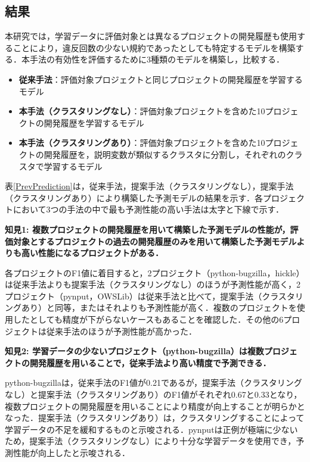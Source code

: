 \documentclass[T,J]{fose} %
\begin{document}
\subsection{結果}

本研究では，学習データに評価対象とは異なるプロジェクトの開発履歴も使用することにより，違反回数の少ない規約であったとしても特定するモデルを構築する．本手法の有効性を評価するために3種類のモデルを構築し，比較する．
\begin{itemize}
\item \textbf{従来手法}：評価対象プロジェクトと同じプロジェクトの開発履歴を学習するモデル
\item \textbf{本手法（クラスタリングなし）}：評価対象プロジェクトを含めた10プロジェクトの開発履歴を学習するモデル
\item \textbf{本手法（クラスタリングあり）}：評価対象プロジェクトを含めた10プロジェクトの開発履歴を，説明変数が類似するクラスタに分割し，それぞれのクラスタで学習するモデル
\end{itemize}

表\ref{PrevPrediction}は，従来手法，提案手法（クラスタリングなし），提案手法（クラスタリングあり）により構築した予測モデルの結果を示す．各プロジェクトにおいて3つの手法の中で最も予測性能の高い手法は太字と下線で示す．

\noindent\textbf{知見1: 複数プロジェクトの開発履歴を用いて構築した予測モデルの性能が，評価対象とするプロジェクトの過去の開発履歴のみを用いて構築した予測モデルよりも高い性能になるプロジェクトがある．}

各プロジェクトのF1値に着目すると，2プロジェクト（python-bugzilla，hickle）は従来手法よりも提案手法（クラスタリングなし）のほうが予測性能が高く，2プロジェクト（pynput，OWSLib）は従来手法と比べて，提案手法（クラスタリングあり）と同等，またはそれよりも予測性能が高く．複数のプロジェクトを使用したとしても精度が下がらないケースもあることを確認した．その他の6プロジェクトは従来手法のほうが予測性能が高かった．

\noindent\textbf{知見2: 学習データの少ないプロジェクト（python-bugzilla）は複数プロジェクトの開発履歴を用いることで，従来手法より高い精度で予測できる．}

python-bugzillaは，従来手法のF1値が0.21であるが，提案手法（クラスタリングなし）と提案手法（クラスタリングあり）のF1値がそれぞれ0.67と0.33となり，複数プロジェクトの開発履歴を用いることにより精度が向上することが明らかとなった．提案手法（クラスタリングあり）は，クラスタリングすることによって学習データの不足を緩和するものと示唆される．pynputは正例が極端に少ないため，提案手法（クラスタリングなし）により十分な学習データを使用でき，予測性能が向上したと示唆される．
\end{document}
